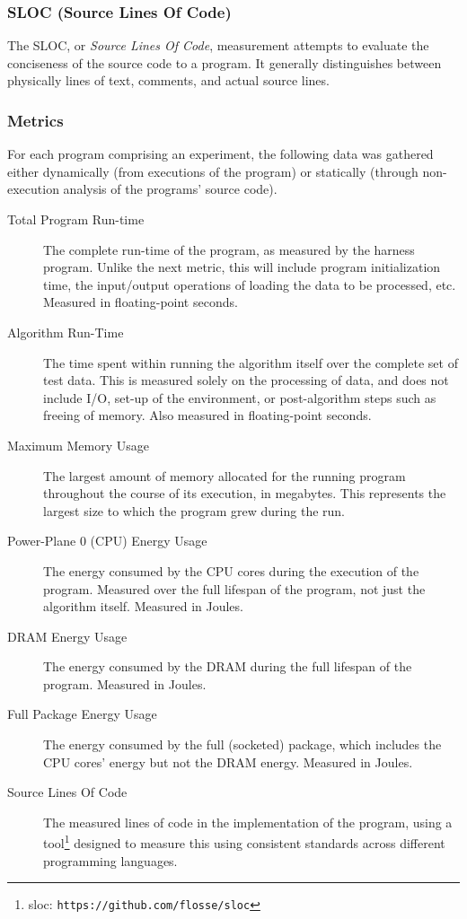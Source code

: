 \subsubsection{SLOC (Source Lines Of Code)}

The SLOC, or \textit{Source Lines Of Code}, measurement attempts to evaluate the conciseness of the source code to a program. It generally distinguishes between physically lines of text, comments, and actual source lines.

\subsubsection{Metrics}

For each program comprising an experiment, the following data was gathered either dynamically (from executions of the program) or statically (through non-execution analysis of the programs' source code).

\begin{description}
\item[Total Program Run-time] The complete run-time of the program, as measured by the harness program. Unlike the next metric, this will include program initialization time, the input/output operations of loading the data to be processed, etc. Measured in floating-point seconds.
\item[Algorithm Run-Time] The time spent within running the algorithm itself over the complete set of test data. This is measured solely on the processing of data, and does not include I/O, set-up of the environment, or post-algorithm steps such as freeing of memory. Also measured in floating-point seconds.
\item[Maximum Memory Usage] The largest amount of memory allocated for the running program throughout the course of its execution, in megabytes. This represents the largest size to which the program grew during the run.
\item[Power-Plane 0 (CPU) Energy Usage] The energy consumed by the CPU cores during the execution of the program. Measured over the full lifespan of the program, not just the algorithm itself. Measured in Joules.
\item[DRAM Energy Usage] The energy consumed by the DRAM during the full lifespan of the program. Measured in Joules.
\item[Full Package Energy Usage] The energy consumed by the full (socketed) package, which includes the CPU cores' energy but not the DRAM energy. Measured in Joules.
\item[Source Lines Of Code] The measured lines of code in the implementation of the program, using a tool\footnote{sloc: \texttt{https://github.com/flosse/sloc}} designed to measure this using consistent standards across different programming languages.
\end{description}

